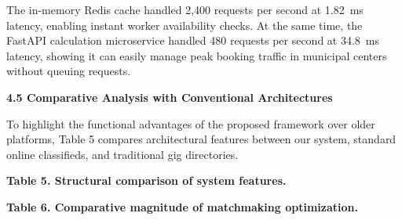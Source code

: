 \documentclass[10pt,twocolumn,a4paper]{article}
\begin{document}
\vspace{0.8em}
The in-memory Redis cache handled 2,400 requests per second at 1.82~ms latency, enabling instant worker availability checks. At the same time, the FastAPI calculation microservice handled 480 requests per second at 34.8~ms latency, showing it can easily manage peak booking traffic in municipal centers without queuing requests.

\vspace{0.8em}
\noindent
\textbf{4.5 Comparative Analysis with Conventional Architectures}

To highlight the functional advantages of the proposed framework over older platforms, Table 5 compares architectural features between our system, standard online classifieds, and traditional gig directories.

\vspace{0.8em}
\noindent
\textbf{Table 5. Structural comparison of system features.}
\vspace{0.3em}

\noindent
{}

\vspace{0.8em}
\noindent
\textbf{Table 6. Comparative magnitude of matchmaking optimization.}
\vspace{0.3em}

\noindent
{}
\end{document}

